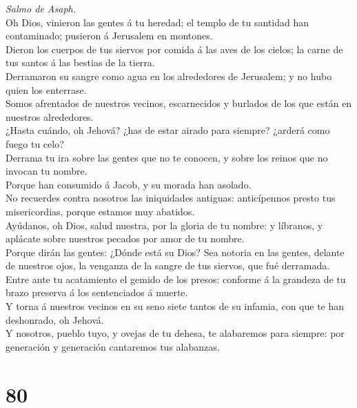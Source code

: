  \emph{Salmo de Asaph.}\\
Oh Dios, vinieron las gentes á tu heredad; el templo de tu santidad han
contaminado; pusieron á Jerusalem en montones.\\
 Dieron los cuerpos de tus siervos por comida á las aves de
los cielos; la carne de tus santos á las bestias de la tierra.\\
 Derramaron su sangre como agua en los alrededores de
Jerusalem; y no hubo quien los enterrase.\\
 Somos afrentados de nuestros vecinos, escarnecidos y
burlados de los que están en nuestros alrededores.\\
 ¿Hasta cuándo, oh Jehová? ¿has de estar airado para
siempre? ¿arderá como fuego tu celo?\\
 Derrama tu ira sobre las gentes que no te conocen, y sobre
los reinos que no invocan tu nombre.\\
 Porque han consumido á Jacob, y su morada han asolado.\\
 No recuerdes contra nosotros las iniquidades antiguas:
anticípennos presto tus misericordias, porque estamos muy abatidos.\\
 Ayúdanos, oh Dios, salud nuestra, por la gloria de tu
nombre: y líbranos, y aplácate sobre nuestros pecados por amor de tu
nombre.\\
 Porque dirán las gentes: ¿Dónde está su Dios? Sea notoria
en las gentes, delante de nuestros ojos, la venganza de la sangre de tus
siervos, que fué derramada.\\
 Entre ante tu acatamiento el gemido de los presos:
conforme á la grandeza de tu brazo preserva á los sentenciados á
muerte.\\
 Y torna á nuestros vecinos en su seno siete tantos de su
infamia, con que te han deshonrado, oh Jehová.\\
 Y nosotros, pueblo tuyo, y ovejas de tu dehesa, te
alabaremos para siempre: por generación y generación cantaremos tus
alabanzas.

\hypertarget{section-79}{%
\section{80}\label{section-79}}


